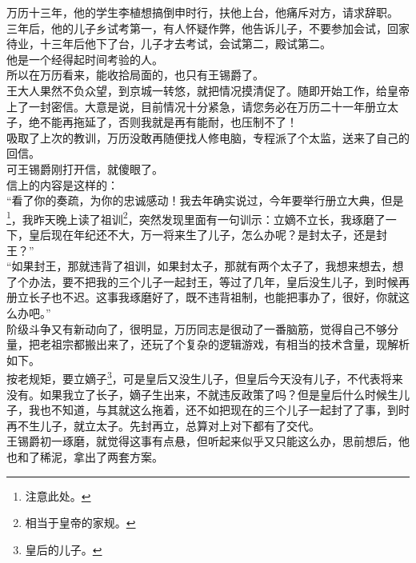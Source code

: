 \begin{multicols}{\theparacolNo}
万历十三年，他的学生李植想搞倒申时行，扶他上台，他痛斥对方，请求辞职。\\

三年后，他的儿子乡试考第一，有人怀疑作弊，他告诉儿子，不要参加会试，回家待业，十三年后他下了台，儿子才去考试，会试第二，殿试第二。\\

他是一个经得起时间考验的人。\\

所以在万历看来，能收拾局面的，也只有王锡爵了。\\

王大人果然不负众望，到京城一转悠，就把情况摸清促了。随即开始工作，给皇帝上了一封密信。大意是说，目前情况十分紧急，请您务必在万历二十一年册立太子，绝不能再拖延了，否则我就是再有能耐，也压制不了！\\

吸取了上次的教训，万历没敢再随便找人修电脑，专程派了个太监，送来了自己的回信。\\

可王锡爵刚打开信，就傻眼了。\\

信上的内容是这样的：\\

“看了你的奏疏，为你的忠诚感动！我去年确实说过，今年要举行册立大典，但是\footnote{注意此处。}，我昨天晚上读了祖训\footnote{相当于皇帝的家规。}，突然发现里面有一句训示：立嫡不立长，我琢磨了一下，皇后现在年纪还不大，万一将来生了儿子，怎么办呢？是封太子，还是封王？”\\

“如果封王，那就违背了祖训，如果封太子，那就有两个太子了，我想来想去，想了个办法，要不把我的三个儿子一起封王，等过了几年，皇后没生儿子，到时候再册立长子也不迟。这事我琢磨好了，既不违背祖制，也能把事办了，很好，你就这么办吧。”\\

阶级斗争又有新动向了，很明显，万历同志是很动了一番脑筋，觉得自己不够分量，把老祖宗都搬出来了，还玩了个复杂的逻辑游戏，有相当的技术含量，现解析如下。\\

按老规矩，要立嫡子\footnote{皇后的儿子。}，可是皇后又没生儿子，但皇后今天没有儿子，不代表将来没有。如果我立了长子，嫡子生出来，不就违反政策了吗？但是皇后什么时候生儿子，我也不知道，与其就这么拖着，还不如把现在的三个儿子一起封了了事，到时再不生儿子，就立太子。先封再立，总算对上对下都有了交代。\\

王锡爵初一琢磨，就觉得这事有点悬，但听起来似乎又只能这么办，思前想后，他也和了稀泥，拿出了两套方案。\\


\end{multicols}
